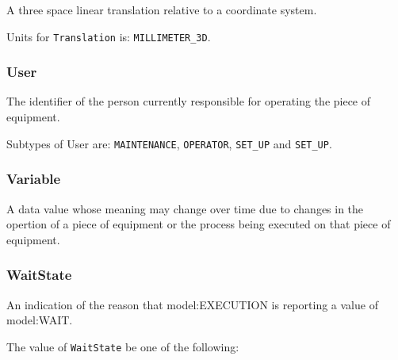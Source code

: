 A three space linear translation relative to a coordinate system.



Units for \texttt{Translation} is: \texttt{MILLIMETER_3D}.

\FloatBarrier

\subsubsection{User}
  \label{sec:User}


The identifier of the person currently responsible for operating the piece of equipment.


Subtypes of User are: \texttt{MAINTENANCE}, \texttt{OPERATOR}, \texttt{SET_UP} and \texttt{SET_UP}. 
\FloatBarrier

\subsubsection{Variable}
  \label{sec:Variable}


A data value whose meaning may change over time due to changes in the opertion of a piece of equipment or the process being executed on that piece of equipment.

\FloatBarrier

\subsubsection{WaitState}
  \label{sec:WaitState}


An indication of the reason that {model:EXECUTION} is reporting a value of {model:WAIT}.


The value of \texttt{WaitState} \MUST be one of the following: 

